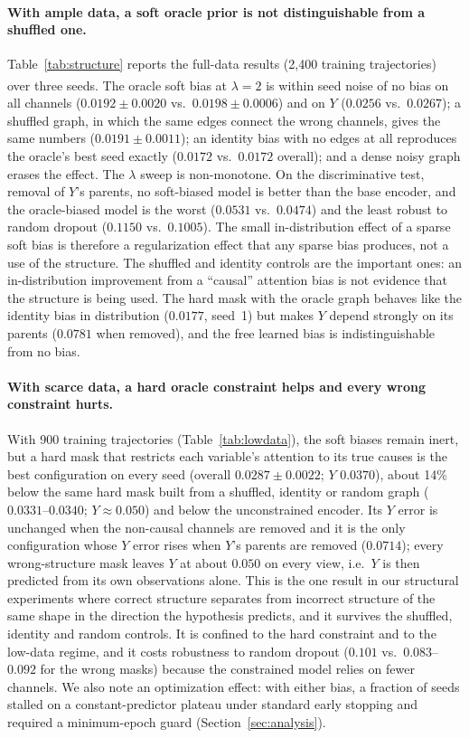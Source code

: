 \documentclass[sigconf,nonacm]{acmart}
\newcommand{\prelim}{\textsuperscript{\dag}}
\begin{document}
\paragraph{With ample data, a soft oracle prior is not distinguishable from a shuffled one.}
Table~\ref{tab:structure} reports the full-data results (2{,}400 training trajectories) over three seeds\prelim.
The oracle soft bias at $\lambda=2$ is within seed noise of no bias on all channels ($0.0192\pm0.0020$ vs.\
$0.0198\pm0.0006$) and on $Y$ ($0.0256$ vs.\ $0.0267$); a shuffled graph, in which the same edges connect the
wrong channels, gives the same numbers ($0.0191\pm0.0011$); an identity bias with no edges at all reproduces the
oracle's best seed exactly ($0.0172$ vs.\ $0.0172$ overall); and a dense noisy graph erases the effect. The
$\lambda$ sweep is non-monotone. On the discriminative test, removal of $Y$'s parents, no soft-biased model is
better than the base encoder, and the oracle-biased model is the worst ($0.0531$ vs.\ $0.0474$) and the least
robust to random dropout ($0.1150$ vs.\ $0.1005$). The small in-distribution effect of a sparse soft bias is
therefore a regularization effect that any sparse bias produces, not a use of the structure. The shuffled and
identity controls are the important ones: an in-distribution improvement from a ``causal'' attention bias is not
evidence that the structure is being used. The hard mask with the oracle graph behaves like the identity bias in
distribution ($0.0177$, seed~1) but makes $Y$ depend strongly on its parents ($0.0781$ when removed), and the free
learned bias is indistinguishable from no bias.

\paragraph{With scarce data, a hard oracle constraint helps and every wrong constraint hurts.}
With 900 training trajectories (Table~\ref{tab:lowdata}), the soft biases remain inert, but a hard mask that
restricts each variable's attention to its true causes is the best configuration on every seed (overall
$0.0287\pm0.0022$; $Y$ $0.0370$), about 14\% below the same hard mask built from a shuffled, identity or random
graph ($0.0331$--$0.0340$; $Y\approx0.050$) and below the unconstrained encoder. Its $Y$ error is unchanged when
the non-causal channels are removed and it is the only configuration whose $Y$ error rises when $Y$'s parents are
removed ($0.0714$); every wrong-structure mask leaves $Y$ at about $0.050$ on every view, i.e.\ $Y$ is then
predicted from its own observations alone. This is the one result in our structural experiments where correct
structure separates from incorrect structure of the same shape in the direction the hypothesis predicts, and it
survives the shuffled, identity and random controls. It is confined to the hard constraint and to the low-data
regime, and it costs robustness to random dropout ($0.101$ vs.\ $0.083$--$0.092$ for the wrong masks) because the
constrained model relies on fewer channels. We also note an optimization effect: with either bias, a fraction of
seeds stalled on a constant-predictor plateau under standard early stopping and required a minimum-epoch guard
(Section~\ref{sec:analysis}).
\end{document}
